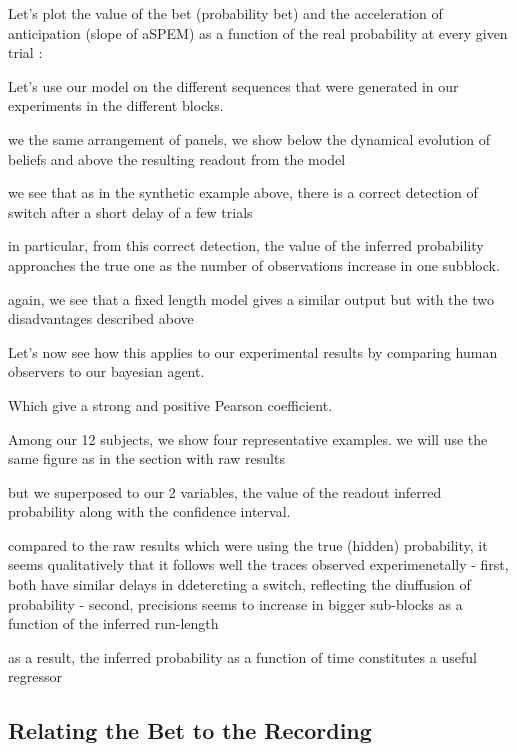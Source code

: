 \documentclass[profile,final,english, draft]{article}%
\begin{document}

Let's plot the value of the bet (probability bet)  and the acceleration of anticipation (slope of aSPEM) as a function of the real probability at every given trial :
%


 Let's use our model on the different sequences that were generated in our experiments in the different blocks.

we the same arrangement of panels, we show below the dynamical evolution of beliefs and above the resulting readout from the model

we see that as in the synthetic example above, there is a correct detection of switch after a short delay of a few trials

in particular, from this correct detection, the value of the inferred probability approaches the true one as the number of observations increase in one subblock.

again, we see that a fixed length model gives a similar output but with the two disadvantages described above

Let's now see how this applies to our experimental results by comparing human observers to our bayesian agent.

Which give a strong and positive Pearson coefficient.



Among our 12 subjects, we show four representative examples. we will use the same figure as in the section with raw results

but we superposed to our 2 variables, the value of the readout inferred probability along with the confidence interval.

compared to the raw results which were using the true (hidden) probability, it seems qualitatively that it follows well the traces observed experimenetally
- first, both have similar delays in ddetercting a switch, reflecting the diuffusion of probability
- second, precisions seems to increase in bigger sub-blocks as a function of the inferred run-length

as a result, the inferred probability as a function of time constitutes a useful regressor


\subsection{Relating the Bet to the Recording}
\end{document}
